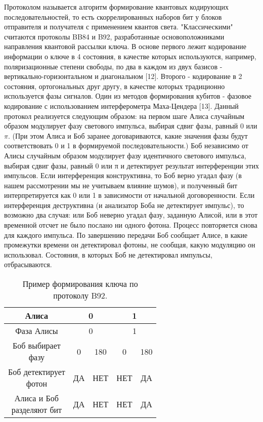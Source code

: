 Протоколом называется алгоритм формирование квантовых кодирующих последовательностей, то есть скоррелированных наборов бит у блоков отправителя и получателя с применением квантов света. "Классическими"  считаются протоколы BB84 и B92, разработанные основоположниками направления квантовой рассылки ключа. В основе первого лежит кодирование информации о ключе в 4 состояния, в качестве которых используются, например, поляризационные степени свободы, по два в каждом из двух базисов - вертикально-горизонтальном и диагональном [12]. Второго - кодирование в 2 состояния, ортогональных друг другу, в качестве которых традиционно используется фазы сигналов. Один из методов формирования кубитов - фазовое кодирование с использованием интерферометра Маха-Цендера [13]. Данный протокол реализуется следующим образом: на первом шаге Алиса случайным образом модулирует фазу светового импульса, выбирая сдвиг фазы, равный 0 или $\pi$. (При этом Алиса и Боб заранее договариваются, какие значения фазы будут соответствовать 0 и 1 в формируемой последовательности.) Боб независимо от Алисы случайным образом модулирует фазу идентичного светового импульса, выбирая сдвиг фазы, равный 0 или π и детектирует результат интерференции этих импульсов. Если интерференция конструктивна, то Боб верно угадал фазу (в нашем рассмотрении мы не учитываем влияние шумов), и полученный бит интерпретируется как 0 или 1 в зависимости от начальной договоренности. Если интерференция деструктивна (и анализатор Боба не детектирует импульс), то возможно два случая: или Боб неверно угадал фазу, заданную Алисой, или в этот временной отсчет не было послано ни одного фотона. Процесс повторяется снова для каждого импульса. По завершению передачи Боб сообщает Алисе, в какие промежутки времени он детектировал фотоны, не сообщая, какую модуляцию он использовал. Состояния, в которых Боб не детектировал импульсы, отбрасываются.


\begin{table} [htbp]
	\centering
	\caption{Пример формирования ключа по протоколу B92.}
	\label{tab:protocol}
	\begin{tabular}{| c | c | c | c | c |}
	 \hline	Алиса                              & \multicolumn{2}{|c|}{0}   & \multicolumn{2}{|c|}{1}   \\ \hline
	  Фаза Алисы					     	   & \multicolumn{2}{|c|}{0}   & \multicolumn{2}{|c|}{1}   \\ \hline
	  \makecell{Боб выбирает \\ фазу}	    	   & 0      	                   & 180    & 0 	& 180      \\ \hline
	  \makecell{Боб детектирует \\ фотон}      & ДА                        & НЕТ    & НЕТ   & ДА       \\ \hline
	  \makecell{Алиса и Боб \\ разделяют бит}  & ДА                        & НЕТ    & НЕТ   & ДА       \\ \hline
	\end{tabular}%
\end{table}


